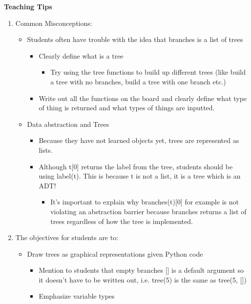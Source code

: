 \begin{blocksection}
	\begin{guide}
	\textbf{Teaching Tips}
	\begin{enumerate}
			\item Common Misconceptions:
			\begin{itemize}
				\item Students often have trouble with the idea that branches is a list of trees
				\begin{itemize}
					\item Clearly define what is a tree
					\begin{itemize}
						\item Try using the tree functions to build up different trees (like build a tree with no branches, build a tree with one branch etc.)
					\end{itemize}
					\item Write out all the functions on the board and clearly define what type of thing is returned and what types of things are inputted.
				\end{itemize}
				\item Data abstraction and Trees
				\begin{itemize}
					\item Because they have not learned objects yet, trees are represented as lists.
					\item Although t[0] returns the label from the tree, students should be using label(t). This is because t is not a list, it is a tree which is an ADT!
					\begin{itemize}
						\item It’s important to explain why branches(t)[0] for example is not violating an abstraction barrier because branches returns a list of trees regardless of how the tree is implemented.
					\end{itemize}
				\end{itemize}
			\end{itemize}
			\item The objectives for students are to: 
			\begin{itemize}
				\item Draw trees as graphical representations given Python code  
				\begin{itemize}
					\item Mention to students that empty branches [] is a default argument so it doesn’t have to be written out, i.e. tree(5) is the same as tree(5, [])
					\item Emphasize variable types

\end{itemize}
\end{itemize}
\end{enumerate}
\end{guide}
\end{blocksection}
